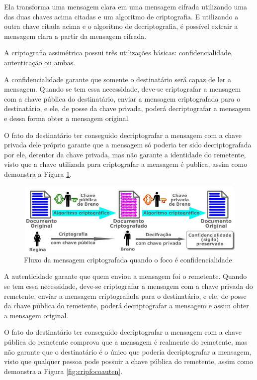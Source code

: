 Ela transforma uma mensagem clara em uma mensagem cifrada utilizando uma das duas chaves acima citadas e um algoritmo de criptografia. E utilizando a outra chave citada acima e o algoritmo de decriptografia, é possível extrair a mensagem clara a partir da mensagem cifrada.

A criptografia assimétrica possui três utilizações básicas: confidencialidade, autenticação ou ambas.

A confidencialidade garante que somente o destinatário será capaz de ler a mensagem. Quando se tem essa necessidade, deve-se criptografar a mensagem com a chave pública do destinatário, enviar a mensagem criptografada para o destinatário, e ele, de posse da chave privada, poderá decriptografar a mensagem e dessa forma obter a mensagem original.

O fato do destinatário ter conseguido decriptografar a mensagem com a chave privada dele próprio garante que a mensagem só poderia ter sido decriptografada por ele, detentor da chave privada, mas não garante a identidade do remetente, visto que a chave utilizada para criptografar a mensagem é publica, assim como demonstra a Figura \ref{fig:cripfococonfi}.

\begin{figure}[H]
    \centering
    \caption{Fluxo da mensagem criptografada quando o foco é confidencialidade}
    \label{fig:cripfococonfi}
    \includegraphics[width=.8\linewidth]{Figuras/Confidencialidade.png}
\end{figure}

A autenticidade garante que quem enviou a mensagem foi o remetente. Quando se tem essa necessidade, deve-se criptografar a mensagem com a chave privada do remetente, enviar a mensagem criptografada para o destinatário, e ele, de posse da chave pública do remetente, poderá decriptografar a mensagem e assim obter a mensagem original.

O fato do destinatário ter conseguido decriptografar a mensagem com a chave pública do remetente comprova que a mensagem é realmente do remetente, mas não garante que o destinatário é o único que poderia decriptografar a mensagem, visto que qualquer pessoa pode possuir a chave pública do remetente, assim como demonstra a Figura \ref{fig:cripfocoauten}.

